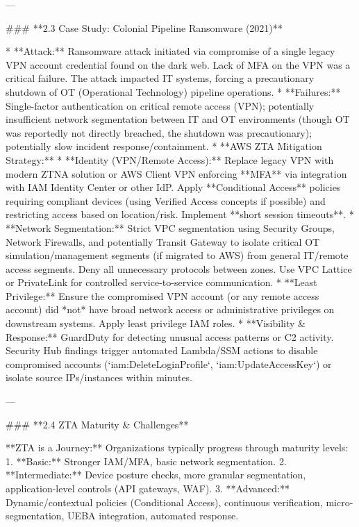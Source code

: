 \documentclass{article}
\begin{document}
---

### **2.3 Case Study: Colonial Pipeline Ransomware (2021)**

* **Attack:** Ransomware attack initiated via compromise of a single legacy VPN account credential found on the dark web. Lack of MFA on the VPN was a critical failure. The attack impacted IT systems, forcing a precautionary shutdown of OT (Operational Technology) pipeline operations.
* **Failures:** Single-factor authentication on critical remote access (VPN); potentially insufficient network segmentation between IT and OT environments (though OT was reportedly not directly breached, the shutdown was precautionary); potentially slow incident response/containment.
* **AWS ZTA Mitigation Strategy:**
    * **Identity (VPN/Remote Access):** Replace legacy VPN with modern ZTNA solution or AWS Client VPN enforcing **MFA** via integration with IAM Identity Center or other IdP. Apply **Conditional Access** policies requiring compliant devices (using Verified Access concepts if possible) and restricting access based on location/risk. Implement **short session timeouts**.
    * **Network Segmentation:** Strict VPC segmentation using Security Groups, Network Firewalls, and potentially Transit Gateway to isolate critical OT simulation/management segments (if migrated to AWS) from general IT/remote access segments. Deny all unnecessary protocols between zones. Use VPC Lattice or PrivateLink for controlled service-to-service communication.
    * **Least Privilege:** Ensure the compromised VPN account (or any remote access account) did *not* have broad network access or administrative privileges on downstream systems. Apply least privilege IAM roles.
    * **Visibility & Response:** GuardDuty for detecting unusual access patterns or C2 activity. Security Hub findings trigger automated Lambda/SSM actions to disable compromised accounts (`iam:DeleteLoginProfile`, `iam:UpdateAccessKey`) or isolate source IPs/instances within minutes.

---

### **2.4 ZTA Maturity & Challenges**

**ZTA is a Journey:** Organizations typically progress through maturity levels:
1.  **Basic:** Stronger IAM/MFA, basic network segmentation.
2.  **Intermediate:** Device posture checks, more granular segmentation, application-level controls (API gateways, WAF).
3.  **Advanced:** Dynamic/contextual policies (Conditional Access), continuous verification, micro-segmentation, UEBA integration, automated response.
\end{document}
